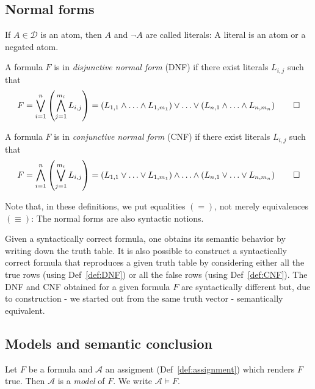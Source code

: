 \subsection{Normal forms}
\begin{definition}[Literal]\label{def:literal}
If \(A \in \mathcal{D}\) is an atom, then \(A\) and \(\neg A\) are called literals:
A literal is an atom or a negated atom.
\end{definition}
\begin{definition}\label{def:DNF}
A formula \(F\) is in \emph{disjunctive normal form} (DNF) if there exist literals \(L_{i,j}\) such that
\[
  F=  \bigvee_{i=1}^n\left(\bigwedge_{j=1}^{m_i} L_{i, j}\right) =  \left(L_{1,1} \wedge \ldots \wedge L_{1, m_1}\right) \vee \ldots  \vee\left(L_{n, 1} \wedge \ldots \wedge L_{n, m_n}\right) \qedhere
\]
\end{definition}
\begin{definition}\label{def:CNF}
A formula \(F\) is in \emph{conjunctive normal form} (CNF) if there exist literals \(L_{i,j}\) such that
\[
  F=  \bigwedge_{i=1}^n\left(\bigvee_{j=1}^{m_i} L_{i, j}\right) =  \left(L_{1,1} \vee \ldots \vee L_{1, m_1}\right) \wedge \ldots  \wedge\left(L_{n, 1} \vee \ldots \vee L_{n, m_n}\right) \qedhere
\]
\end{definition}
Note that, in these definitions, we put equalities $(=)$, not merely equivalences $(\equiv)$: The normal forms are also syntactic notions.

Given a syntactically correct formula, one obtains its semantic behavior by writing down the truth table.
It is also possible to construct a syntactically correct formula that reproduces a given truth table by considering either all the true rows (using Def~\ref{def:DNF}) or all the false rows (using Def~\ref{def:CNF}).
The DNF and CNF obtained for a given formula \(F\) are syntactically different but, due to construction - we started out from the same truth vector - semantically equivalent.


\subsection{Models and semantic conclusion}
\begin{definition}[Model]\label{def:model}
  Let \(F\) be a formula and \(\mathcal{A}\) an assigment (Def~\ref{def:assignment}) which renders \(F\) true.
  Then \(\mathcal{A}\) is a \emph{model} of \(F\).
  We write \(\mathcal{A} \models F\).
\end{definition}

